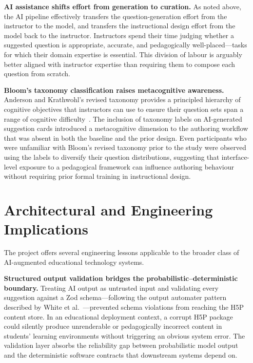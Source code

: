 \textbf{AI assistance shifts effort from generation to curation.} As noted
above, the AI pipeline effectively transfers the question-generation effort
from the instructor to the model, and transfers the instructional design
effort from the model back to the instructor. Instructors spend their time
judging whether a suggested question is appropriate, accurate, and
pedagogically well-placed---tasks for which their domain expertise is
essential. This division of labour is arguably better aligned with
instructor expertise than requiring them to compose each question from
scratch.

\textbf{Bloom's taxonomy classification raises metacognitive awareness.}
Anderson and Krathwohl's revised taxonomy provides a principled hierarchy
of cognitive objectives that instructors can use to ensure their question
sets span a range of cognitive difficulty~\cite{anderson2001}. The inclusion
of taxonomy labels on AI-generated suggestion cards introduced a
metacognitive dimension to the authoring workflow that was absent in both
the baseline and the prior design. Even participants who were unfamiliar
with Bloom's revised taxonomy prior to the study were observed using the
labels to diversify their question distributions, suggesting that interface-
level exposure to a pedagogical framework can influence authoring behaviour
without requiring prior formal training in instructional design.

\section{Architectural and Engineering Implications}

The project offers several engineering lessons applicable to the broader
class of AI-augmented educational technology systems.

\textbf{Structured output validation bridges the probabilistic--deterministic
boundary.} Treating AI output as untrusted input and validating every
suggestion against a Zod schema---following the output automater pattern
described by White et al.~\cite{white2023}---prevented schema violations
from reaching the H5P content store. In an educational deployment context,
a corrupt H5P package could silently produce unrenderable or pedagogically
incorrect content in students' learning environments without triggering an
obvious system error. The validation layer absorbs the reliability gap
between probabilistic model output and the deterministic software contracts
that downstream systems depend on.

